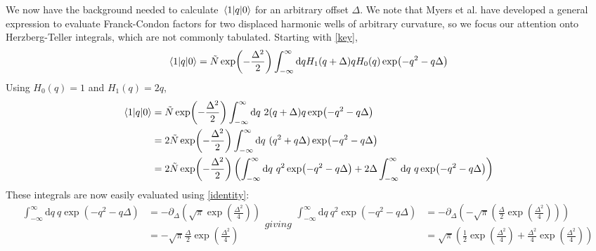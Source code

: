 \documentclass[aip, jcp, reprint, onecolumn, nofootinbib]{revtex4-2}
\begin{document}
We now have the background needed to calculate $\mel{1}{q}{0}$ for an arbitrary offset $\Delta$.
We note that Myers et al. have developed a general expression to evaluate Franck-Condon factors for two displaced harmonic wells of arbitrary curvature,\cite{Myers1982} so we focus our attention onto Herzberg-Teller integrals, which are not commonly tabulated.
Starting with \autoref{key},
\begin{equation}
\begin{split}
	\mel{1}{q}{0} = \tilde{N} \exp(-\frac{\Delta^2}{2}) \int_{-\infty}^\infty \mathrm{d}q H_1(q+\Delta) q H_0(q) \exp(-q^2 - q\Delta)
\end{split}
\end{equation}
Using $H_0(q) = 1$ and $H_1(q) = 2q$,\cite{RN230} 
\begin{equation}\label{HT10}
	\begin{split}
		\mel{1}{q}{0} &= \tilde{N} \exp(-\frac{\Delta^2}{2}) \int_{-\infty}^\infty \mathrm{d}q \ 2(q + \Delta) q \exp(-q^2 - q\Delta)\\
		&= 2\tilde{N} \exp(-\frac{\Delta^2}{2}) \int_{-\infty}^\infty \mathrm{d}q \ (q^2 + q \Delta) \exp(-q^2 - q\Delta)\\
		&=  2\tilde{N} \exp(-\frac{\Delta^2}{2}) \left(\int_{-\infty}^\infty \mathrm{d}q \ q^2 \exp(-q^2 - q\Delta) + 2\Delta \int_{-\infty}^\infty \mathrm{d}q \ q \exp(-q^2 - q\Delta) \right)
	\end{split}
\end{equation}
These integrals are now easily evaluated using \autoref{identity}:
\begin{subequations}\label{evalGaussians}
	\begin{equation}
		\begin{split}
					\int_{-\infty}^\infty \mathrm{d}q \ q \exp(-q^2 - q\Delta) &= -\partial_{\Delta} \left(\sqrt{\pi} \exp(\frac{\Delta^2}{4})\right)\\
					& = -\sqrt{\pi} \frac{\Delta}{2} \exp(\frac{\Delta^2}{4})
		\end{split}
	\end{equation}
giving
\begin{equation}
	\begin{split}
		\int_{-\infty}^\infty \mathrm{d}q \ q^2 \exp(-q^2 - q\Delta) &= -\partial_{\Delta} \left(-\sqrt{\pi} \left(\frac{\Delta}{2} \exp(\frac{\Delta^2}{4})\right)\right)\\
		& =\sqrt{\pi} \left(\frac{1}{2}\exp(\frac{\Delta^2}{4}) + \frac{\Delta^2}{4} \exp(\frac{\Delta^2}{4})\right)
	\end{split}
\end{equation}
\end{subequations}
\end{document}
